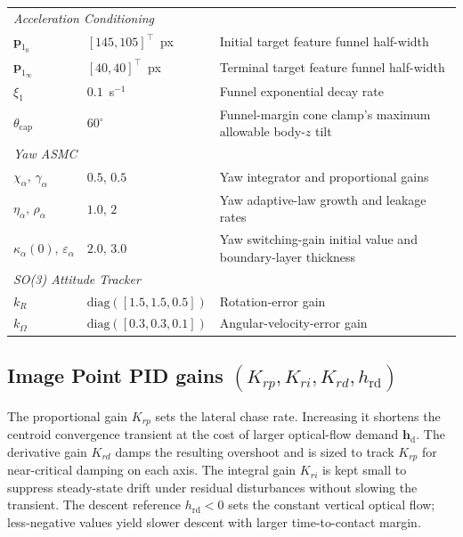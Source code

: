 \documentclass{IEEEtaes}
\begin{document}
\begin{table}[!t]
\begin{tabular}{p{} p{} p{}}
    \midrule
        \multicolumn{3}{l}{\textit{Acceleration Conditioning}} \\
        $\boldsymbol{p}_{1_0}$      & $[145,105]^\top$~px & Initial target feature funnel half-width \\
        $\boldsymbol{p}_{1_\infty}$ & $[40,40]^\top$~px & Terminal target feature funnel half-width \\
        $\xi_1$                     & $0.1$~s$^{-1}$ & Funnel exponential decay rate \\
        $\theta_\text{cap}$         & $60^\circ$ & Funnel-margin cone clamp's maximum allowable body-$z$ tilt \\
    \midrule
        \multicolumn{3}{l}{\textit{Yaw ASMC}} \\
        $\chi_\alpha,\,\gamma_\alpha$       & $0.5,\,0.5$ & Yaw integrator and proportional gains \\
        $\eta_\alpha,\,\rho_\alpha$         & $1.0,\,2$ & Yaw adaptive-law growth and leakage rates \\
        $\kappa_{\alpha}(0),\,\varepsilon_\alpha$ & $2.0,\,3.0$ & Yaw switching-gain initial value and boundary-layer thickness \\
    \midrule
        \multicolumn{3}{l}{\textit{SO(3) Attitude Tracker}} \\
        $k_R$      & $\text{diag}([1.5,1.5,0.5])$ & Rotation-error gain \\
        $k_\Omega$ & $\text{diag}([0.3,0.3,0.1])$ & Angular-velocity-error gain \\
    \bottomrule
    \end{tabular}
\end{table}

\subsection{Image Point PID gains $(K_{rp}, K_{ri}, K_{rd}, h_\text{rd})$} The proportional gain $K_{rp}$ sets the lateral chase rate. Increasing it shortens the centroid convergence transient at the cost of larger optical-flow demand $\boldsymbol{h}_\text{d}$. The derivative gain $K_{rd}$ damps the resulting overshoot and is sized to track $K_{rp}$ for near-critical damping on each axis. The integral gain $K_{ri}$ is kept small to suppress steady-state drift under residual disturbances without slowing the transient. The descent reference $h_\text{rd}<0$ sets the constant vertical optical flow; less-negative values yield slower descent with larger time-to-contact margin.
\end{document}
